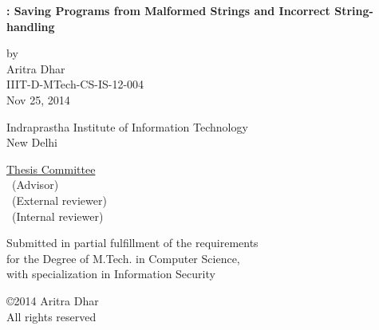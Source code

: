 \begin{center}

{\LARGE \bf {\tool: Saving Programs from Malformed Strings and Incorrect
String-handling}

 }  
 \vspace{.3in}
 
 by\\
 \vspace{.1in}
 {\Large{Aritra Dhar}} \\  
 \vspace{.1in} 
 IIIT-D-MTech-CS-IS-12-004 \\

 Nov 25, 2014 \\
  
    \vspace{.35in}

  \vspace{.25in}

{Indraprastha Institute of Information Technology\\
New Delhi}

\vspace{.6in}  {\underline{Thesis Committee}} \\ 
\supervisorone~(Advisor) \\
\external~(External reviewer) \\
\internal~(Internal reviewer)
  \\ \vspace{.4in}


 {Submitted in partial fulfillment of the requirements \\for the Degree of M.Tech. in Computer Science, \\ with specialization in Information Security}

\vspace{1.5in}


\copyright 2014 Aritra Dhar \\ All rights reserved \\
\vspace{.8in}


\end{center}


